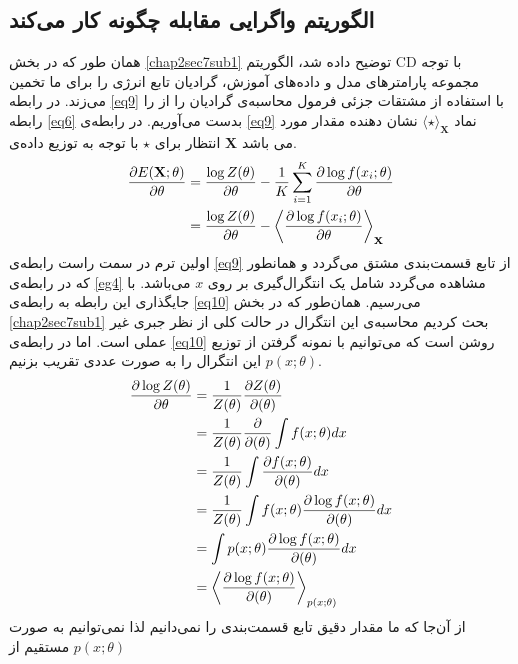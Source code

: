 \subsection{الگوریتم واگرایی مقابله چگونه کار می‌کند}
همان طور که در بخش
\ref{chap2sec7sub1}
توضیح داده شد، الگوریتم
CD
با توجه مجموعه پارامترهای مدل و داده‌های آموزش، گرادیان تابع انرژی را برای ما تخمین می‌‌زند.  در رابطه
\ref{eq9}
 با استفاده از مشتقات جزئی فرمول محاسبه‌ی گرادیان را از را رابطه
\ref{eq6}
 بدست می‌‌آوریم. در رابطه‌ی
\ref{eq9}
 نماد
$\langle \star \rangle_\textbf{X}$
 نشان دهنده مقدار مورد انتظار برای
$\star$
 با توجه به توزیع داده‌ی
\textbf{X}
 می‌ باشد.
\begin{align}
\centering
\label{eq9}
	\dfrac{\partial E(\textbf{X};\theta)}{\partial \theta} &= \dfrac{\log Z(\theta)}{\partial \theta} - \dfrac{1}{K}\sum_{i=1}^K\dfrac{\partial \log f(x_i;\theta)}{\partial \theta}\\\nonumber
	&= \dfrac{\log Z(\theta)}{\partial \theta} - \left\langle \dfrac{\partial \log f(x_i;\theta)}{\partial \theta}\right\rangle_\textbf{X}
\end{align}
اولین ترم در سمت راست رابطه‌‌ی
\ref{eq9}
از تابع قسمت‌بندی مشتق می‌گردد و همانطور که در رابطه‌ی
\ref{eg4}
مشاهده می‌‌گردد شامل یک انتگرال‌گیری بر روی
$x$
می‌باشد. با جایگذاری این رابطه به رابطه‌ی
\ref{eq10}
می‌رسیم. همان‌طور که در بخش
\ref{chap2sec7sub1}
بحث کردیم محاسبه‌ی این انتگرال در حالت کلی‌ از نظر جبری غیر عملی‌ است. اما در رابطه‌ی
\ref{eq10}
روشن است که می‌‌توانیم با نمونه گرفتن از توزیع
$p(x;\theta)$
این انتگرال را به صورت عددی تقریب بزنیم.
\begin{align}
\centering
\label{eq10}
	\dfrac{\partial\log Z(\theta)}{\partial \theta} &= \dfrac{1}{Z(\theta)}\dfrac{\partial Z(\theta)}{\partial(\theta)}\\ \nonumber
	&=\dfrac{1}{Z(\theta)}\dfrac{\partial}{\partial(\theta)}\int f(x;\theta)dx\\ \nonumber
	&=\dfrac{1}{Z(\theta)}\int \dfrac{\partial f(x;\theta)}{\partial(\theta)}dx\\	\nonumber
	&=\dfrac{1}{Z(\theta)}\int f(x;\theta) \dfrac{\partial \log f(x;\theta)}{\partial(\theta)}dx\\ \nonumber
	&= \int p(x;\theta) \dfrac{\partial \log f(x;\theta)}{\partial(\theta)}dx\\ \nonumber
	&= \left\langle \dfrac{\partial \log f(x;\theta)}{\partial(\theta)}\right\rangle_{p(x;\theta)}
\end{align}
از آن‌جا که ما مقدار دقیق تابع قسمت‌بندی را نمی‌‌دانیم لذا نمی‌‌توانیم به صورت مستقیم از
$p(x;\theta)$
